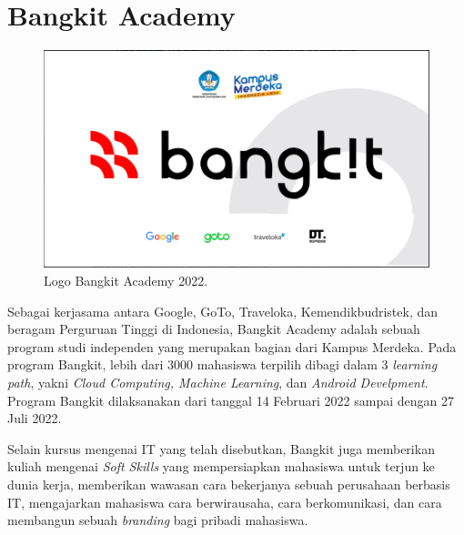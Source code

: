 \section{Bangkit Academy}
\begin{figure}[H]
	\centering
	\includegraphics[scale=0.25]{./assets/logobangkit}
	\caption{Logo Bangkit Academy 2022.}
\end{figure}
Sebagai kerjasama antara Google, GoTo, Traveloka, Kemendikbudristek, dan beragam Perguruan Tinggi di Indonesia, Bangkit Academy adalah sebuah program studi independen yang merupakan bagian dari Kampus Merdeka. Pada program Bangkit, lebih dari 3000 mahasiswa terpilih dibagi dalam 3 \textit{learning path}, yakni \textit{Cloud Computing, Machine Learning}, dan \textit{Android Develpment}. Program Bangkit dilaksanakan dari tanggal 14 Februari 2022 sampai dengan 27 Juli 2022.

Selain kursus mengenai IT yang telah disebutkan, Bangkit juga memberikan kuliah mengenai \textit{Soft Skills} yang mempersiapkan mahasiswa untuk terjun ke dunia kerja, memberikan wawasan cara bekerjanya sebuah perusahaan berbasis IT, mengajarkan mahasiswa cara berwirausaha, cara berkomunikasi, dan cara membangun sebuah \textit{branding} bagi pribadi mahasiswa.